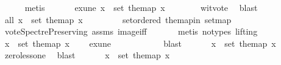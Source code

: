 \begin{isabellebody}
\ \ \ \ \isamarkupfalse%
\ metis\ \isanewline
\ \ \isamarkupfalse%
\ \isamarkupfalse%
\ exune{\isacharcolon}{\kern0pt}\ {\isachardoublequoteopen}{\isasymexists}x\ {\isasymin}\ set\ the{\isacharunderscore}{\kern0pt}map{\isachardot}{\kern0pt}\ x\ {\isasymnoteq}\ {}{\isachardoublequoteclose}\isanewline
\ \ \ \ \isamarkupfalse%
\ wit{\isacharunderscore}{\kern0pt}vote\ \isamarkupfalse%
\ blast\ \isanewline
\ \ \isamarkupfalse%
\ all{}{}{\isacharcolon}{\kern0pt}\ {\isachardoublequoteopen}{\isasymforall}x\ {\isasymin}\ set\ the{\isacharunderscore}{\kern0pt}map{\isachardot}{\kern0pt}\ x\ {\isasymin}\ {\isacharbraceleft}{\kern0pt}{}{\isacharcomma}{\kern0pt}{}{\isacharbraceright}{\kern0pt}{\isachardoublequoteclose}\ \isanewline
\ \ \ \ \isamarkupfalse%
\ set{\isacharunderscore}{\kern0pt}ordered\ the{\isacharunderscore}{\kern0pt}map{\isacharunderscore}{\kern0pt}in\ set{\isacharunderscore}{\kern0pt}map\ \isamarkupfalse%
\ vote{\isacharunderscore}{\kern0pt}Spectre{\isacharunderscore}{\kern0pt}Preserving\ assms{\isacharparenleft}{\kern0pt}{}{\isacharparenright}{\kern0pt}\ image{\isacharunderscore}{\kern0pt}iff\ \isanewline
\ \ \ \ \isamarkupfalse%
\ {\isacharparenleft}{\kern0pt}metis\ {\isacharparenleft}{\kern0pt}no{\isacharunderscore}{\kern0pt}types{\isacharcomma}{\kern0pt}\ lifting{\isacharparenright}{\kern0pt}{\isacharparenright}{\kern0pt}\isanewline
\ \ \isamarkupfalse%
\ \isamarkupfalse%
\ {\isachardoublequoteopen}{\isasymexists}x\ {\isasymin}\ set\ the{\isacharunderscore}{\kern0pt}map{\isachardot}{\kern0pt}\ x\ {\isacharequal}{\kern0pt}\ {}{\isachardoublequoteclose}\ \isamarkupfalse%
\ exune\isanewline
\ \ \ \ \ \ \ \ \ \ \isamarkupfalse%
\ blast\ \isanewline
\ \ \isamarkupfalse%
\ \isamarkupfalse%
\ {\isachardoublequoteopen}{\isasymexists}x\ {\isasymin}\ set\ the{\isacharunderscore}{\kern0pt}map{\isachardot}{\kern0pt}\ x\ {\isachargreater}{\kern0pt}\ {}{\isachardoublequoteclose}\isanewline
\ \ \ \ \isamarkupfalse%
\ zero{\isacharunderscore}{\kern0pt}less{\isacharunderscore}{\kern0pt}one\ \isamarkupfalse%
\ blast\ \isanewline
\ \ \isamarkupfalse%
\ \isamarkupfalse%
\ {\isachardoublequoteopen}{\isasymforall}x\ {\isasymin}\ set\ the{\isacharunderscore}{\kern0pt}map{\isachardot}{\kern0pt}\ x\ {\isasymge}\ {}{\isachardoublequoteclose}\ \isamarkupfalse%

\end{isabellebody}
